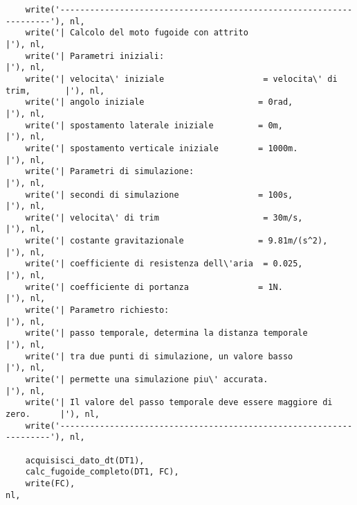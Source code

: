 \begin{verbatim}
    write('--------------------------------------------------------------------'), nl,
    write('| Calcolo del moto fugoide con attrito                             |'), nl,
    write('| Parametri iniziali:                                              |'), nl,
    write('| velocita\' iniziale                    = velocita\' di trim,       |'), nl,
    write('| angolo iniziale                       = 0rad,                    |'), nl,
    write('| spostamento laterale iniziale         = 0m,                      |'), nl,
    write('| spostamento verticale iniziale        = 1000m.                   |'), nl,
    write('| Parametri di simulazione:                                        |'), nl,
    write('| secondi di simulazione                = 100s,                    |'), nl,
    write('| velocita\' di trim                     = 30m/s,                   |'), nl,
    write('| costante gravitazionale               = 9.81m/(s^2),             |'), nl,
    write('| coefficiente di resistenza dell\'aria  = 0.025,                   |'), nl,
    write('| coefficiente di portanza              = 1N.                      |'), nl,
    write('| Parametro richiesto:                                             |'), nl,
    write('| passo temporale, determina la distanza temporale                 |'), nl,
    write('| tra due punti di simulazione, un valore basso                    |'), nl,
    write('| permette una simulazione piu\' accurata.                          |'), nl,
    write('| Il valore del passo temporale deve essere maggiore di zero.      |'), nl,
    write('--------------------------------------------------------------------'), nl,

    acquisisci_dato_dt(DT1),                                                       
    calc_fugoide_completo(DT1, FC),
    write(FC),                                                                     nl,


\end{verbatim}
